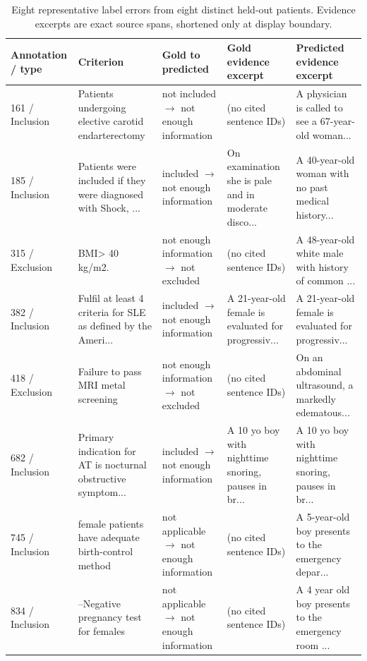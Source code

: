 \begin{table}[t]\centering\caption{Eight representative label errors from eight distinct held-out patients. Evidence excerpts are exact source spans, shortened only at display boundary.}
\scriptsize\setlength{\tabcolsep}{2pt}\begin{tabular}{p{1.6cm}p{3.5cm}p{2.5cm}p{4.5cm}p{4.5cm}}\toprule Annotation / type & Criterion & Gold to predicted & Gold evidence excerpt & Predicted evidence excerpt \\
\midrule
161 / Inclusion & Patients undergoing elective carotid endarterectomy & not included $\rightarrow$ not enough information & (no cited sentence IDs) & A physician is called to see a 67-year-old woman... \\
185 / Inclusion & Patients were included if they were diagnosed with Shock, ... & included $\rightarrow$ not enough information & On examination she is pale and in moderate disco... & A 40-year-old woman with no past medical history... \\
315 / Exclusion & BMI> 40 kg/m2. & not enough information $\rightarrow$ not excluded & (no cited sentence IDs) & A 48-year-old white male with history of common ... \\
382 / Inclusion & Fulfil at least 4 criteria for SLE as defined by the Ameri... & included $\rightarrow$ not enough information & A 21-year-old female is evaluated for progressiv... & A 21-year-old female is evaluated for progressiv... \\
418 / Exclusion & Failure to pass MRI metal screening & not enough information $\rightarrow$ not excluded & (no cited sentence IDs) & On an abdominal ultrasound, a markedly edematous... \\
682 / Inclusion & Primary indication for AT is nocturnal obstructive symptom... & included $\rightarrow$ not enough information & A 10 yo boy with nighttime snoring, pauses in br... & A 10 yo boy with nighttime snoring, pauses in br... \\
745 / Inclusion & female patients have adequate birth-control method & not applicable $\rightarrow$ not enough information & (no cited sentence IDs) & A 5-year-old boy presents to the emergency depar... \\
834 / Inclusion & --Negative pregnancy test for females & not applicable $\rightarrow$ not enough information & (no cited sentence IDs) & A 4 year old boy presents to the emergency room ... \\
\bottomrule\end{tabular}\end{table}